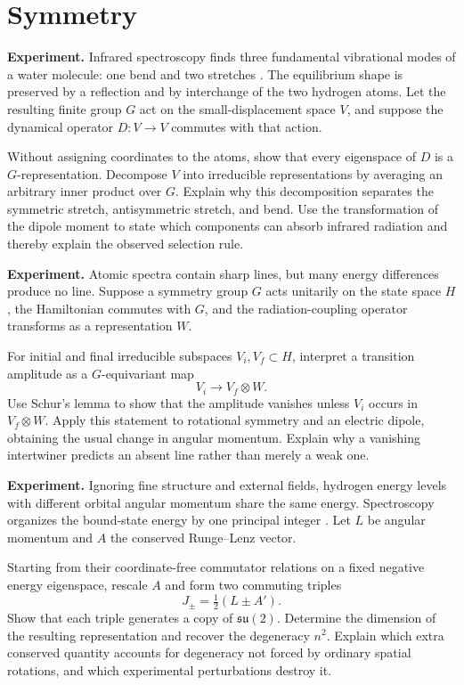 \section{Symmetry}

\begin{exercise}
\textbf{Experiment.}
Infrared spectroscopy finds three fundamental vibrational modes of a water
molecule: one bend and two stretches \cite{shimanouchi}.  The equilibrium
shape is preserved by a reflection and by interchange of the two hydrogen
atoms.  Let the resulting finite group \(G\) act on the small-displacement
space \(V\), and suppose the dynamical operator \(D:V\to V\) commutes with
that action.

Without assigning coordinates to the atoms, show that every eigenspace of
\(D\) is a \(G\)-representation.  Decompose \(V\) into irreducible
representations by averaging an arbitrary inner product over \(G\).  Explain
why this decomposition separates the symmetric stretch, antisymmetric
stretch, and bend.  Use the transformation of the dipole moment to state which
components can absorb infrared radiation and thereby explain the observed
selection rule.
\end{exercise}

\begin{exercise}
\textbf{Experiment.}
Atomic spectra contain sharp lines, but many energy differences produce no
line.  Suppose a symmetry group \(G\) acts unitarily on the state space \(H\),
the Hamiltonian commutes with \(G\), and the radiation-coupling operator
transforms as a representation \(W\).

For initial and final irreducible subspaces \(V_i,V_f\subset H\), interpret a
transition amplitude as a \(G\)-equivariant map
\[
        V_i\longrightarrow V_f\otimes W.
\]
Use Schur's lemma to show that the amplitude vanishes unless \(V_i\) occurs in
\(V_f\otimes W\).  Apply this statement to rotational symmetry and an electric
dipole, obtaining the usual change in angular momentum.  Explain why a
vanishing intertwiner predicts an absent line rather than merely a weak one.
\end{exercise}

\begin{exercise}
\textbf{Experiment.}
Ignoring fine structure and external fields, hydrogen energy levels with
different orbital angular momentum share the same energy.  Spectroscopy
organizes the bound-state energy by one principal integer \cite{hydrogen}.
Let \(L\) be angular momentum and \(A\) the conserved Runge--Lenz vector.

Starting from their coordinate-free commutator relations on a fixed negative
energy eigenspace, rescale \(A\) and form two commuting triples
\[
        J_\pm=\tfrac12(L\pm A').
\]
Show that each triple generates a copy of \(\mathfrak{su}(2)\).  Determine the
dimension of the resulting representation and recover the degeneracy \(n^2\).
Explain which extra conserved quantity accounts for degeneracy not forced by
ordinary spatial rotations, and which experimental perturbations destroy it.
\end{exercise}

